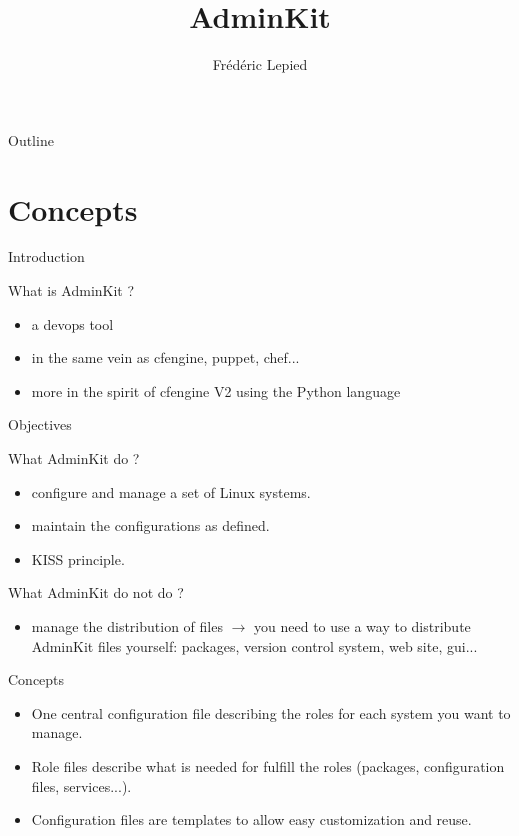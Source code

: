 \documentclass[xcolor=dvipsnames]{beamer}
\author{Frédéric Lepied}
\title{AdminKit}
\begin{document}
\begin{frame}[plain]
  \titlepage
\end{frame}

\begin{frame}{Outline}
  \tableofcontents
\end{frame}

\section{Concepts}
\begin{frame}{Introduction}

What is AdminKit ?

\begin{itemize}
  \item a devops tool
  \item in the same vein as cfengine, puppet, chef...
  \item more in the spirit of cfengine V2 using the Python language
\end{itemize}

\end{frame}

\begin{frame}{Objectives}

What AdminKit do ?

\begin{itemize}
  \item configure and manage a set of Linux systems.
  \item maintain the configurations as defined.
  \item KISS principle.
\end{itemize}

What AdminKit do not do ?

\begin{itemize}
  \item manage the distribution of files $\rightarrow$ you need to use a way to
    distribute AdminKit files yourself: packages, version control
    system, web site, gui...
\end{itemize}

\end{frame}

\begin{frame}{Concepts}

\begin{itemize}
  \item One central configuration file describing the roles for each
    system you want to manage.
  \item Role files describe what is needed for fulfill the roles (packages,
    configuration files, services...).
  \item Configuration files are templates to allow easy customization
    and reuse.
\end{itemize}

\end{frame}
\end{document}
